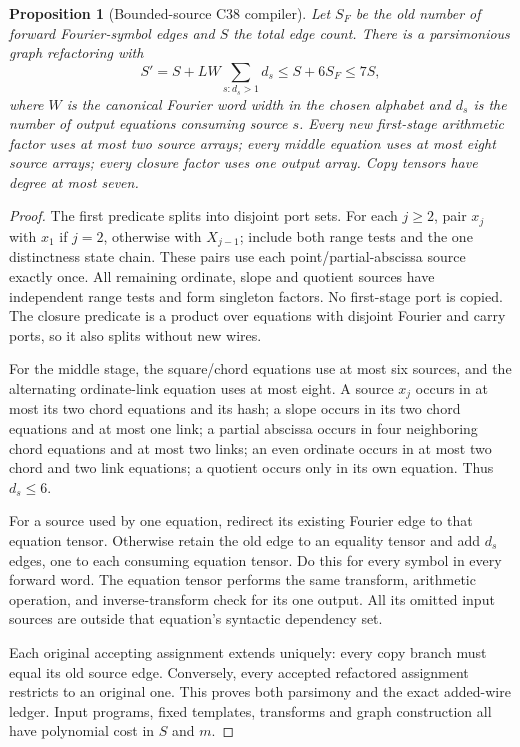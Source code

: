 \documentclass[11pt]{article}
\newtheorem{proposition}{Proposition}
\begin{document}
\begin{proposition}[Bounded-source C38 compiler]
Let $S_F$ be the old number of forward Fourier-symbol edges and $S$
the total edge count. There is a parsimonious graph refactoring with
\[
 S'=S+LW\sum_{s:d_s>1}d_s\le S+6S_F\le7S,
\]
where $W$ is the canonical Fourier word width in the chosen alphabet
and $d_s$ is the number of output equations consuming source $s$.
Every new first-stage arithmetic factor uses at most two source arrays;
every middle equation uses at most eight source arrays; every closure
factor uses one output array. Copy tensors have degree at most seven.
\end{proposition}
\begin{proof}
The first predicate splits into disjoint port sets. For each $j\ge2$,
pair $x_j$ with $x_1$ if $j=2$, otherwise with $X_{j-1}$; include
both range tests and the one distinctness state chain. These pairs use
each point/partial-abscissa source exactly once. All remaining ordinate,
slope and quotient sources have independent range tests and form singleton
factors. No first-stage port is copied. The closure predicate is a product
over equations with disjoint Fourier and carry ports, so it also splits
without new wires.

For the middle stage, the square/chord equations use at most six sources,
and the alternating ordinate-link equation uses at most eight. A source
$x_j$ occurs in at most its two chord equations and its hash; a slope
occurs in its two chord equations and at most one link; a partial abscissa
occurs in four neighboring chord equations and at most two links; an
even ordinate occurs in at most two chord and two link equations; a
quotient occurs only in its own equation. Thus $d_s\le6$.

For a source used by one equation, redirect its existing Fourier edge
to that equation tensor. Otherwise retain the old edge to an equality
tensor and add $d_s$ edges, one to each consuming equation tensor.
Do this for every symbol in every forward word. The equation tensor
performs the same transform, arithmetic operation, and inverse-transform
check for its one output. All its omitted input sources are outside
that equation's syntactic dependency set.

Each original accepting assignment extends uniquely: every copy branch
must equal its old source edge. Conversely, every accepted refactored
assignment restricts to an original one. This proves both parsimony and
the exact added-wire ledger. Input programs, fixed templates, transforms
and graph construction all have polynomial cost in $S$ and $m$.
\end{proof}
\end{document}
